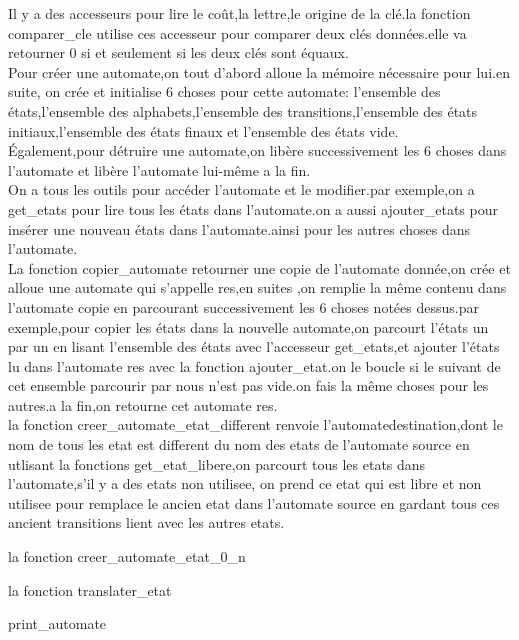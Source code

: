 \documentclass{report}
\begin{document}
Il y a des accesseurs pour lire le coût,la lettre,le origine de la clé.la fonction comparer\_cle utilise ces accesseur pour comparer deux clés données.elle va retourner 0 si et seulement si les deux clés sont équaux.\\

Pour créer une automate,on tout d'abord alloue la mémoire nécessaire pour lui.en suite, on crée et initialise 6 choses pour cette automate: l'ensemble des états,l'ensemble des alphabets,l'ensemble des transitions,l'ensemble des états initiaux,l'ensemble des états finaux et l'ensemble des états vide.\\

Également,pour détruire une automate,on libère successivement les 6 choses dans l'automate et libère l'automate lui-même a la fin.\\

On a tous les outils pour accéder l'automate et le modifier.par exemple,on a get\_etats pour lire tous les états dans l'automate.on a aussi ajouter\_etats pour insérer une nouveau états dans l'automate.ainsi pour les autres choses dans l'automate.\\

La fonction copier\_automate retourner une copie de l'automate donnée,on crée et alloue une automate qui s'appelle res,en suites ,on remplie la même contenu  dans l'automate copie en parcourant successivement les 6 choses notées dessus.par exemple,pour copier les états dans la nouvelle automate,on parcourt l'états un par un en lisant l'ensemble des états avec l'accesseur get\_etats,et ajouter l'états lu dans l'automate res avec la fonction ajouter\_etat.on le boucle si le suivant de cet ensemble parcourir par nous n'est pas vide.on fais la même choses pour les autres.a la fin,on retourne cet automate res.\\

la fonction creer\_automate\_etat\_different renvoie l'automatedestination,dont le nom de tous les etat est different du nom des etats de l'automate source en utlisant la fonctions get\_etat\_libere,on parcourt tous les etats dans l'automate,s'il y a des etats non utilisee, on prend ce etat qui est libre et non utilisee pour remplace le ancien etat dans l'automate source en gardant tous ces ancient transitions lient avec les autres etats.

la fonction creer\_automate\_etat\_0_n

la fonction translater_etat

print\_automate
\end{document}
